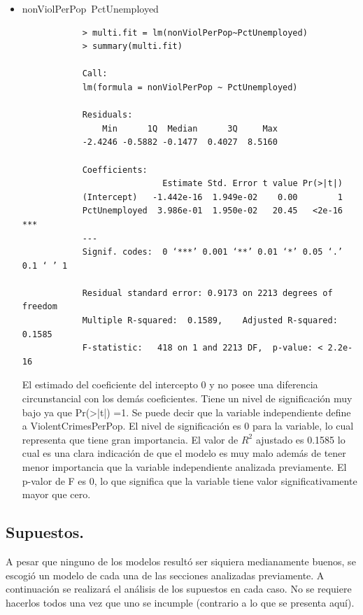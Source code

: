 \documentclass[a4paper,10pt,twocolumn]{article}
\begin{document}
\begin{itemize}
	\item{nonViolPerPop~PctUnemployed}
		\begin{verbatim}
			> multi.fit = lm(nonViolPerPop~PctUnemployed)
			> summary(multi.fit)

			Call:
			lm(formula = nonViolPerPop ~ PctUnemployed)

			Residuals:
				Min      1Q  Median      3Q     Max 
			-2.4246 -0.5882 -0.1477  0.4027  8.5160 

			Coefficients:
							Estimate Std. Error t value Pr(>|t|)    
			(Intercept)   -1.442e-16  1.949e-02    0.00        1    
			PctUnemployed  3.986e-01  1.950e-02   20.45   <2e-16 ***
			---
			Signif. codes:  0 ‘***’ 0.001 ‘**’ 0.01 ‘*’ 0.05 ‘.’ 0.1 ‘ ’ 1

			Residual standard error: 0.9173 on 2213 degrees of freedom
			Multiple R-squared:  0.1589,	Adjusted R-squared:  0.1585 
			F-statistic:   418 on 1 and 2213 DF,  p-value: < 2.2e-16
		\end{verbatim}

	El estimado del coeficiente del intercepto 0 y no posee una diferencia circunstancial con los demás coeficientes. Tiene un nivel de significación muy bajo ya que Pr(>|t|) =1.
	Se puede decir que la variable independiente define a ViolentCrimesPerPop. El nivel de significación es 0 para la variable, lo cual representa que tiene gran importancia. El valor de $R^2$ ajustado es 0.1585 lo cual es una clara indicación de que el modelo es muy malo además de tener menor importancia que la variable independiente analizada previamente. El p-valor de F es 0, lo que significa que la variable tiene valor significativamente mayor que cero.

\end{itemize}

\subsection*{Supuestos.}

	A pesar que ninguno de los modelos resultó ser siquiera medianamente buenos, se escogió un modelo de cada una de las secciones analizadas previamente. A continuación se realizará el análisis de los supuestos en cada caso. No se requiere hacerlos todos una vez que uno se incumple (contrario a lo que se presenta aquí).
\end{document}
